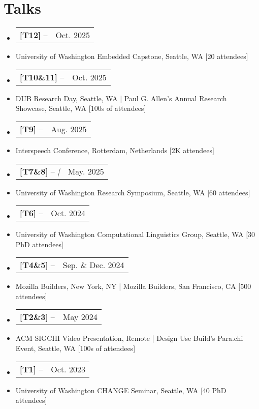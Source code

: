 \documentclass[letterpaper,11pt]{article}
\makeatletter
\newcommand{\resumeTopItem}[4]{
    \vspace{-1pt}\item[]
    \begin{tabular*}{0.97\textwidth}{l@{\extracolsep{\fill}}r}
        \textbf{#1} -- \textit{#2} & #3 \\
    \end{tabular*}\vspace{-5pt}
    \item[]{\small{#4}}\vspace{-2pt}
}
\newcommand{\resumeSubHeadingListStart}{\begin{itemize}[leftmargin=*]}
\newcommand{\resumeSubHeadingListEnd}{\end{itemize}}
\makeatother
\begin{document}
\section{Talks}
\resumeSubHeadingListStart
\resumeTopItem{[T12]}{\href{https://sandergi.com/images/MAX78000_DEMO.pdf}{\dotuline{Embedded ML - Computer Vision Demo}}}{Oct. 2025}{
    University of Washington Embedded Capstone, Seattle, WA [20 attendees]
}
\resumeTopItem{[T10\&11]}{\href{https://docs.google.com/presentation/d/1XNRk8qb2RPiSYrVpxZaxItbfVP-UmISv/edit?usp=sharing\&ouid=110368631524695946265\&rtpof=true\&sd=true}{\dotuline{In-Context Interactive Environmental Impact Communication}}}{Oct. 2025}{
    DUB Research Day, Seattle, WA | Paul G. Allen's Annual Research Showcase, Seattle, WA [100s of attendees]
}
\resumeTopItem{[T9]}{\href{https://www.interspeech2025.org/home}{\dotuline{Deploying Speech Technology at Scale}}}{Aug. 2025}{
    Interspeech Conference, Rotterdam, Netherlands [2K attendees]
}
\resumeTopItem{[T7\&8]}{\href{https://docs.google.com/presentation/d/1Giw_u8XKrby_i51ffmLsIflefSI6qQem0FtMYbfchZs/edit?usp=sharing}{\dotuline{Graph Embedding and Genus}} | \href{https://docs.google.com/presentation/d/1i_Cgw6-gkC61TXUSUXWIr0OdXsFOMHFp1-PsEdg3Rvk/edit?usp=sharing}{\dotuline{Speech Technology Built For Everyone, Everwhere}}}{May. 2025}{
    University of Washington Research Symposium, Seattle, WA [60 attendees]
}
\resumeTopItem{[T6]}{\href{https://docs.google.com/presentation/d/16tZGX8pRINhTTnhDZHCynEDKyfHl0I9tVnjHukLFnuM/mobilepresent?slide=id.p}{\dotuline{Computational Linguistics for Machine Aided Pronunciation Learning}}}{Oct. 2024}{
    University of Washington Computational Linguistics Group, Seattle, WA [30 PhD attendees]
}
\resumeTopItem{[T4\&5]}{\href{https://www.youtube.com/watch?v=oWEe9op0bb0}{\dotuline{The Future of Language Learning}}}{Sep. \& Dec. 2024}{
    Mozilla Builders, New York, NY | Mozilla Builders, San Francisco, CA [500 attendees]
}
\resumeTopItem{[T2\&3]}{\href{https://parachidub.wpcomstaging.com/}{\dotuline{eKichabi v2: Designing and Scaling a Dual Platform Technology in Rural Tanzania}}}{May 2024}{
    ACM SIGCHI Video Presentation, Remote | Design Use Build's Para.chi Event, Seattle, WA [100s of attendees]
}
\resumeTopItem{[T1]}{\href{https://sandergi.com/images/CHANGE_Seminar_Talk_eKichabi_v2.pdf}{\dotuline{Designing and Deploying Digital Information Systems in Sub-Saharan Africa}}}{Oct. 2023}{
    University of Washington CHANGE Seminar, Seattle, WA [40 PhD attendees]
}
\resumeSubHeadingListEnd
\end{document}
